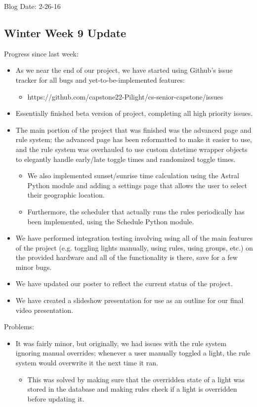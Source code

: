 Blog Date: 2-26-16

\subsection{Winter Week 9 Update}
Progress since last week:
\begin{itemize}
   \item As we near the end of our project, we have started using Github's issue tracker for all bugs and yet-to-be-implemented features:
      \begin{itemize}
         \item https://github.com/capstone22-Pilight/cs-senior-capstone/issues
      \end{itemize}
   \item Essentially finished beta version of project, completing all high priority issues.
   \item The main portion of the project that was finished was the advanced page and rule system; the advanced page has been reformatted to make it easier to use, and the rule system was overhauled to use custom datetime wrapper objects to elegantly handle early/late toggle times and randomized toggle times.
      \begin{itemize}
         \item We also implemented sunset/sunrise time calculation using the Astral Python module and adding a settings page that allows the user to select their geographic location.
         \item Furthermore, the scheduler that actually runs the rules periodically has been implemented, using the Schedule Python module.
      \end{itemize}
   \item We have performed integration testing involving using all of the main features of the project (e.g. toggling lights manually, using rules, using groups, etc.) on the provided hardware and all of the functionality is there, save for a few minor bugs.
   \item We have updated our poster to reflect the current status of the project.
   \item We have created a slideshow presentation for use as an outline for our final video presentation.
\end{itemize}
Problems:
\begin{itemize}
   \item It was fairly minor, but originally, we had issues with the rule system ignoring manual overrides; whenever a user manually toggled a light, the rule system would overwrite it the next time it ran.
      \begin{itemize}
         \item This was solved by making sure that the overridden state of a light was stored in the database and making rules check if a light is overridden before updating it.
      \end{itemize}
\end{itemize}
